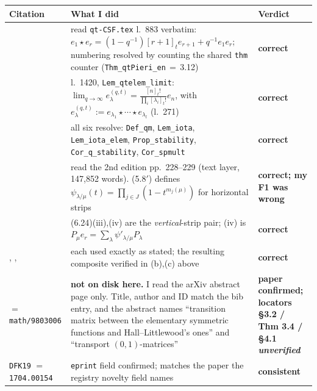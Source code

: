 \documentclass[11pt]{article}
\begin{document}
\begin{center}\small
\begin{tabular}{@{}p{}p{}l@{}}
\toprule
\textbf{Citation} & \textbf{What I did} & \textbf{Verdict}\\
\midrule
\cite[Thm.~3.12]{Hikita25}
 & read \texttt{qt-CSF.tex} l.~883 verbatim: $e_1\star e_r=(1-q^{-1})[r+1]_te_{r+1}+q^{-1}e_1e_r$;
   numbering resolved by counting the shared \texttt{thm} counter (\texttt{Thm\_qtPieri\_en}$\,=\,$3.12)
 & \textbf{correct}\\
\cite[Lemma~6.3]{Hikita25}
 & l.~1420, \texttt{Lem\_qtelem\_limit}: $\lim_{q\to\infty}e^{(q,t)}_\lambda=\frac{[n]_t!}{\prod_i[\lambda_i]_t!}e_n$,
   with $e^{(q,t)}_\lambda:=e_{\lambda_1}\star\cdots\star e_{\lambda_l}$ (l.~271)
 & \textbf{correct}\\
\cite[Def.~3.4; Lemma~3.1, 3.3; Prop.~3.8; Cor.~3.9, 3.10]{Hikita25}
 & all six resolve: \texttt{Def\_qm}, \texttt{Lem\_iota}, \texttt{Lem\_iota\_elem},
   \texttt{Prop\_stability}, \texttt{Cor\_q\_stability}, \texttt{Cor\_spmult}
 & \textbf{correct}\\
\cite[III (5.8$'$)]{Macdonald95}
 & read the 2nd edition pp.~228--229 (text layer, 147{,}852 words). (5.8$'$) defines
   $\psi_{\lambda/\mu}(t)=\prod_{j\in J}(1-t^{m_j(\mu)})$ for horizontal strips
 & \textbf{correct; my F1 was wrong}\\
\cite[VI (6.24)(iv)]{Macdonald95}
 & (6.24)(iii),(iv) are the \emph{vertical}-strip pair; (iv) is $P_\mu e_r=\sum_\lambda\psi'_{\lambda/\mu}P_\lambda$
 & \textbf{correct}\\
\cite[III (3.2)]{Macdonald95}, \cite[III (2.6), (2.8), (2.10), (6.5), (1.4)]{Macdonald95}, \cite[I \S6]{Macdonald95}
 & each used exactly as stated; the resulting composite verified in (b),(c) above
 & \textbf{correct}\\
\cite{Kirillov98} $=$ \texttt{math/9803006}
 & \textbf{not on disk here.} I read the arXiv abstract page only. Title, author and ID match the bib
   entry, and the abstract names ``transition matrix between the elementary symmetric functions and
   Hall--Littlewood's ones'' and ``transport $(0,1)$-matrices''
 & \textbf{paper confirmed; locators \S3.2 / Thm 3.4 / \S4.1 \emph{unverified}}\\
\texttt{DFK19} $=$ \texttt{1704.00154}
 & \texttt{eprint} field confirmed; matches the paper the registry novelty field names
 & \textbf{consistent}\\
\bottomrule
\end{tabular}
\end{center}
\end{document}
